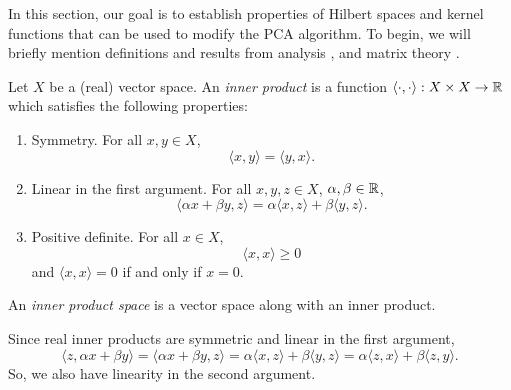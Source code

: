 

In this section, our goal is to establish properties of Hilbert spaces and kernel functions that can be used to modify the PCA algorithm.
To begin, we will briefly mention definitions and results from analysis \cite{kreyszig1991introductory}, \cite{rudin1987real} and matrix theory \cite{horn2013matrix}.

\begin{definition}
    \cite{small1994hilbert} %
    Let \(X\) be a (real) vector space.
    An \textit{inner product} is a function \(\langle \cdot, \cdot \rangle : X \times X \to \mathbb{R}\) which satisfies the following properties:
    \begin{enumerate}
        \item Symmetry. For all \(x,y \in X\),
        \[\langle x,y \rangle = \langle y, x \rangle.\]
        \item Linear in the first argument. For all \(x,y,z \in X\), \(\alpha, \beta \in \mathbb{R}\),
        \[\langle \alpha x + \beta y, z \rangle = \alpha \langle x, z \rangle + \beta \langle y, z \rangle.\]
        \item Positive definite. For all \(x \in X\),
        \[\langle x, x \rangle \geq 0\]
        and \(\langle x, x \rangle = 0\) if and only if \(x = 0\).
    \end{enumerate}
    An \textit{inner product space} is a vector space along with an inner product.
\end{definition}

Since real inner products are symmetric and linear in the first argument,
\[
    \langle z, \alpha x + \beta y\rangle
    = \langle \alpha x + \beta y, z \rangle
    = \alpha \langle x, z \rangle + \beta \langle y, z \rangle
    = \alpha \langle z, x \rangle + \beta \langle z, y \rangle
.\]
So, we also have linearity in the second argument.

